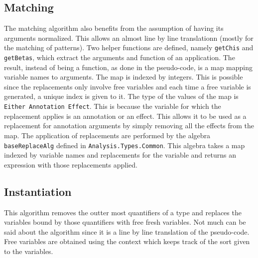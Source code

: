 \documentclass[8pt]{extarticle}
\begin{document}
\subsection{Matching}
The matching algorithm also benefits from the assumption of having its arguments normalized. This allows an almost line by line translationn (mostly for the matching of patterns). Two helper functions are defined, namely \verb+getChis+ and \verb+getBetas+, which extract the arguments and function of an application. The result, instead of being a function, as done in the pseudo-code, is a map mapping variable names to arguments. The map is indexed by integers. This is possible since the replacements only involve free variables and each time a free variable is generated, a unique index is given to it. The type of the values of the map is \verb+Either Annotation Effect+. This is because the variable for which the replacement applies is an annotation or an effect. This allows it to be used as a replacement for annotation arguments by simply removing all the effects from the map. The application of replacements are performed by the algebra \verb+baseReplaceAlg+ defined in \verb+Analysis.Types.Common+. This algebra takes a map indexed by variable names and replacements for the variable and returns an expression with those replacements applied.
\subsection{Instantiation}
This algorithm removes the outter most quantifiers of a type and replaces the variables bound by those quantifiers with free fresh variables. Not much can be said about the algorithm since it is a line by line translation of the pseudo-code. Free variables are obtained using the context which keeps track of the sort given to the variables.
\end{document}
